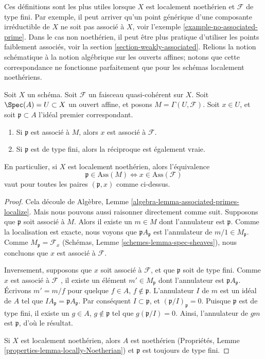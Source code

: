 \noindent
Ces définitions sont les plus utiles lorsque  $X$  est localement
noethérien et  $\mathcal{F}$  de type fini. Par exemple, il peut arriver qu'un point
générique d'une composante irréductible de  $X$  ne soit pas associé à
 $X$, voir l'exemple  \ref{example-no-associated-prime}. Dans le cas non noethérien, il peut
être plus pratique d'utiliser les points faiblement associés, voir la section
 \ref{section-weakly-associated}. Relions la notion schématique à la notion algébrique sur les
ouverts affines; notons que cette correspondance ne fonctionne parfaitement que
pour les schémas localement noethériens.

\begin{lemma}
\label{lemma-associated-affine-open}
Soit  $X$  un schéma. Soit  $\mathcal{F}$  un faisceau quasi-cohérent sur
 $X$. Soit  $\Spec(A) = U \subset X$  un ouvert affine, et posons  $M = \Gamma(U, \mathcal{F})$. Soit
 $x \in U$, et soit  $\mathfrak p \subset A$  l'idéal premier correspondant.
\begin{enumerate}
\item Si  $\mathfrak p$  est associé à  $M$, alors  $x$  est associé à
 $\mathcal{F}$.
\item Si  $\mathfrak p$  est de type fini, alors la réciproque est également vraie.
\end{enumerate}
En particulier, si  $X$  est localement noethérien, alors l'équivalence
$$
\mathfrak p \in \text{Ass}(M) \Leftrightarrow x \in \text{Ass}(\mathcal{F})
$$
vaut pour toutes les paires  $(\mathfrak p, x)$  comme ci-dessus.
\end{lemma}

\begin{proof}
Cela découle de Algèbre, Lemme  \ref{algebra-lemma-associated-primes-localize}. Mais nous pouvons aussi raisonner
directement comme suit. Supposons que  $\mathfrak p$  soit associé à  $M$.
Alors il existe un  $m \in M$  dont l'annulateur est  $\mathfrak p$. Comme la
localisation est exacte, nous voyons que  $\mathfrak pA_{\mathfrak p}$  est l'annulateur de
 $m/1 \in M_{\mathfrak p}$. Comme  $M_{\mathfrak p} = \mathcal{F}_x$  (Schémas, Lemme  \ref{schemes-lemma-spec-sheaves}), nous concluons que
 $x$  est associé à  $\mathcal{F}$.

\medskip\noindent
Inversement, supposons que  $x$  soit associé à  $\mathcal{F}$, et que
 $\mathfrak p$  soit de type fini. Comme  $x$  est associé à  $\mathcal{F}$ , il
existe un élément  $m' \in M_{\mathfrak p}$  dont l'annulateur est  $\mathfrak pA_{\mathfrak p}$. Écrivons
 $m' = m/f$  pour quelque  $f \in A$,  $f \not \in \mathfrak p$. L'annulateur  $I$  de
 $m$  est un idéal de  $A$  tel que  $IA_{\mathfrak p} = \mathfrak pA_{\mathfrak p}$. Par conséquent
 $I \subset \mathfrak p$, et  $(\mathfrak p/I)_{\mathfrak p} = 0$. Puisque  $\mathfrak p$  est de type fini, il existe un
 $g \in A$,  $g \not \in \mathfrak p$  tel que  $g(\mathfrak p/I) = 0$. Ainsi, l'annulateur de
 $gm$  est  $\mathfrak p$, d'où le résultat.

\medskip\noindent
Si  $X$  est localement noethérien, alors  $A$  est noethérien
(Propriétés, Lemme  \ref{properties-lemma-locally-Noetherian}) et  $\mathfrak p$  est toujours de type fini.
\end{proof}

